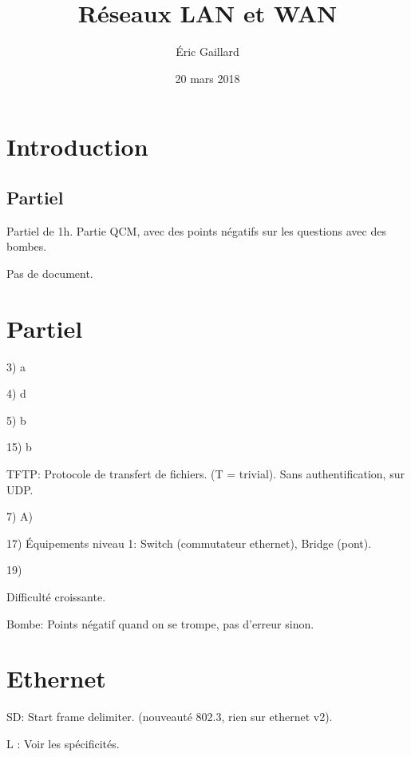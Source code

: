 \documentclass[a4paper,11pt]{article}
\title{Réseaux LAN et WAN}
\author{Éric Gaillard}
\date{20 mars 2018}
\begin{document}
\maketitle
\tableofcontents

\section{Introduction}

\subsection{Partiel}

Partiel de 1h. Partie QCM, avec des points négatifs sur les questions avec des
bombes.

Pas de document.

\section{Partiel}

3) a

4) d

5) b

15) b

TFTP: Protocole de transfert de fichiers. (T = trivial). Sans authentification,
sur UDP.

7) A)

17) Équipements niveau 1: Switch (commutateur ethernet), Bridge (pont).

19) 

Difficulté croissante.

Bombe: Points négatif quand on se trompe, pas d'erreur sinon.

\section{Ethernet}

SD: Start frame delimiter. (nouveauté 802.3, rien sur ethernet v2).

L : Voir les spécificités.
\end{document}
